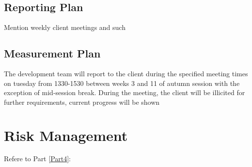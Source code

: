 \subsection{Reporting Plan}

Mention weekly client meetings and such


\subsection{Measurement Plan}

The development team will report to the client during the specified meeting times on tuesday from 1330-1530 between weeks 3 and 11 of autumn session with the exception of mid-session break. During the meeting, the client will be illicited for further requirements, current progress will be shown


\section{Risk Management}

	Refere to Part \ref{Part4}:
